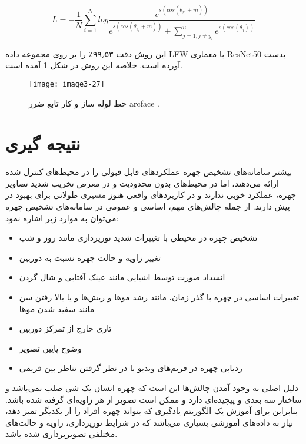 \begin{equation}\label{eq3-15}
L = - \frac{1}{N} \sum_{i=1}^{N} log \frac{e^{s(cos(\theta_{y_i}+m))}}{e^{s(cos(\theta_{y_i}+m))} + \sum_{j=1, j\neq y_i}^{n} e^{s(cos(\theta_j))}}
\end{equation}

\noindent
\noindent
این روش دقت ۹۹٫۵۳٪ را بر روی مجموعه داده LFW با معماری ResNet50 بدست آورده است. خلاصه این روش در شکل \ref{image3-27} آمده است.

\begin{figure}[h]
\centering
  \texttt{[image: image3-27]}
  \caption{خط لوله ساز و کار تابع ضرر arcface \cite{deng2019arcface}.}
  \label{image3-27}
\end{figure}

\section{نتیجه گیری}
بیشتر سامانه‌های تشخیص چهره عملکردهای قابل قبولی را در محیط‌های کنترل شده ارائه می‌دهند، اما در محیط‌های بدون محدودیت و در معرض تخریب شدید تصاویر چهره، عملکرد خوبی ندارند و در کاربردهای واقعی هنوز مسیری طولانی برای بهبود در پیش دارند. از جمله چالش‌های مهم، اساسی و عمومی در سامانه‌های تشخیص چهره می‌توان به موارد زیر اشاره نمود:

\begin{itemize}
\item
تشخیص چهره در محیطی با تغییرات شدید نورپردازی مانند روز و شب 
 \item
تغییر زاویه و حالت چهره نسبت به دوربین 
 \item
انسداد صورت توسط اشیایی مانند عینک آفتابی و شال گردن 
 \item
تغییرات اساسی در چهره با گذر زمان، مانند رشد موها و ریش‌ها و یا بالا رفتن سن مانند سفید شدن موها 
 \item
تاری خارج از تمرکز دوربین 
 \item
وضوح پایین تصویر 
 \item
ردیابی چهره در فریم‌های ویدیو با در نظر گرفتن تناظر بین فریمی 
\end{itemize}

\noindent
دلیل اصلی به وجود آمدن چالش‌ها این است که چهره انسان یک شی صلب نمی‌باشد و ساختار سه بعدی و پیچیده‌ای دارد و ممکن است تصویر از هر زاویه‌ای گرفته شده باشد. بنابراین برای آموزش یک الگوریتم یادگیری که بتواند چهره افراد را از یکدیگر تمیز دهد، نیاز به داده‌های آموزشی بسیاری می‌باشد که در شرایط نورپردازی، زاویه و حالت‌های مختلفی تصویربرداری شده باشد.

